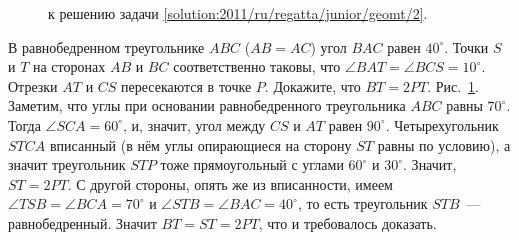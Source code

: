 \ifsolution
\begin{figure}\centering
    \caption{к решению задачи \ref{solution:2011/ru/regatta/junior/geomt/2}.}
    \label{fig:solution:2011/ru/regatta/junior/geomt/2}
\end{figure}%
\fi %

\problem
В равнобедренном треугольнике $ABC$ ($AB = AC$) угол $BAC$ равен $40^\circ$.
Точки $S$ и $T$ на сторонах $AB$ и $BC$ соответственно таковы, что
$\angle BAT = \angle BCS = 10^\circ$.
Отрезки $AT$ и $CS$ пересекаются в точке $P$.
Докажите, что $BT = 2 PT$.
\solution
\label{solution:2011/ru/regatta/junior/geomt/2}%
Рис.~\ref{fig:solution:2011/ru/regatta/junior/geomt/2}.
Заметим, что углы при основании равнобедренного треугольника $ABC$ равны
$70^\circ$.
Тогда $\angle SCA = 60^\circ$, и, значит, угол между $CS$ и $AT$ равен
$90^\circ$.
Четырехугольник $STCA$ вписанный
(в нём углы опирающиеся на сторону $ST$ равны по условию),
а значит треугольник $STP$ тоже прямоугольный с углами $60^\circ$ и $30^\circ$.
Значит, $ST = 2 PT$.
С другой стороны, опять же из вписанности, имеем
$\angle TSB = \angle BCA = 70^\circ$ и
$\angle STB = \angle BAC = 40^\circ$,
то есть треугольник $STB$~--- равнобедренный.
Значит $BT = ST = 2 PT$, что и требовалось доказать.
\endproblem
